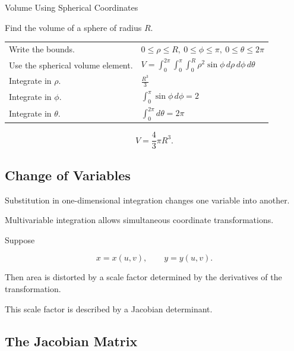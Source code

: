 \begin{workedexamplebox}{Volume Using Spherical Coordinates}

Find the volume of a sphere of radius \(R\).

\begin{tabularx}{\textwidth}{@{}>{\raggedright\arraybackslash}p{}X@{}}
Write the bounds. &
\(0\leq\rho\leq R,\ 0\leq\phi\leq\pi,\ 0\leq\theta\leq2\pi\)\\
Use the spherical volume element. &
\(\displaystyle V=\int_0^{2\pi}\int_0^\pi\int_0^R
\rho^2\sin\phi\,d\rho\,d\phi\,d\theta\)\\
Integrate in \(\rho\). &
\(\displaystyle \frac{R^3}{3}\)\\
Integrate in \(\phi\). &
\(\displaystyle \int_0^\pi\sin\phi\,d\phi=2\)\\
Integrate in \(\theta\). &
\(\displaystyle \int_0^{2\pi}d\theta=2\pi\)
\end{tabularx}

\begin{answerbox}
\[ \boxed{V=\frac43\pi R^3.} \]
\end{answerbox}
\end{workedexamplebox}

\subsection{Change of Variables}
\label{subsec:change-of-variables-multivariable}

Substitution in one-dimensional integration changes one variable into
another.

Multivariable integration allows simultaneous coordinate transformations.

Suppose

\[ x=x(u,v),\qquad y=y(u,v). \]

Then area is distorted by a scale factor determined by the derivatives of
the transformation.

This scale factor is described by a Jacobian determinant.

\subsection{The Jacobian Matrix}
\label{subsec:jacobian-matrix}


